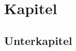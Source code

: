 \documentclass[a4paper]{scrreprt}
\begin{document}
\newcommand{\tAuthor}{Max Mustermann}
\newcommand{\tTitle}{Musterpromotion}
\newcommand{\tDegree}{Dr. med.}
\newcommand{\tBirthday}{02.12.1409}
\newcommand{\tNativeTown}{Leipzig}
\newcommand{\tDepartment}{Universtität Leipzig / Klinik für Tex-Krankheiten}
\newcommand{\tSupervisor}{Carl Ludwig \\ Paul Flechsig}
\newcommand{\tDefenceDate}{01.01.1970}



\tableofcontents

\section{Kapitel}

\subsection{Unterkapitel}


\end{document}
